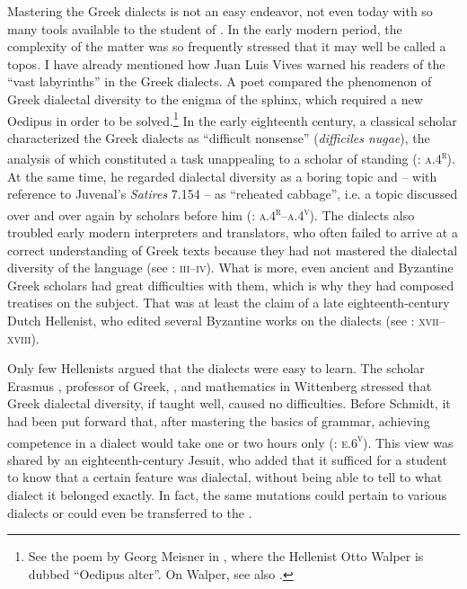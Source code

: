Mastering the Greek dialects is not an easy endeavor, not even today with so many tools available to the student of . In the early modern period, the complexity of the matter was so frequently stressed that it may well be called a topos. I have already mentioned how Juan Luis Vives warned his readers of the “vast labyrinths” in the Greek dialects. A  poet compared the phenomenon of Greek dialectal diversity to the enigma of the sphinx, which required a new Oedipus in order to be solved.\footnote{See the poem by Georg Meisner in \citet[††.2\textsc{\textsuperscript{r}}]{Walper1589}, where the Hellenist Otto Walper is dubbed “Oedipus alter”. On Walper, see also \citet[]{VanRooyFcc}.} In the early eighteenth century, a  classical scholar characterized the Greek dialects as “difficult nonsense” (\textit{difficiles nugae}), the analysis of which constituted a task unappealing to a scholar of standing (\citealt{Maittaire1706}: \textsc{a.4}\textsc{\textsuperscript{r}}). At the same time, he regarded dialectal diversity as a boring topic and – with reference to Juvenal’s \textit{Satires} 7.154 – as “reheated cabbage”, i.e. a topic discussed over and over again by scholars before him (\citealt{Maittaire1706}: \textsc{a.4}\textsc{\textsuperscript{r}}--\textsc{a.4}\textsc{\textsuperscript{v}}). The dialects also troubled early modern interpreters and translators, who often failed to arrive at a correct understanding of Greek texts because they had not mastered the dialectal diversity of the language (see \citealt{Facius1782}: \textsc{iii–iv}). What is more, even ancient and Byzantine Greek scholars had great difficulties with them, which is why they had composed treatises on the subject. That was at least the claim of a late eighteenth-century Dutch Hellenist, who edited several Byzantine works on the dialects (see \citealt{Koen1766}: \textsc{xvii–xviii}).

Only few Hellenists argued that the dialects were easy to learn. The  scholar Erasmus \citet[):(.2\textsc{\textsuperscript{r}}]{Schmidt1604}, professor of Greek, , and mathematics in Wittenberg stressed that Greek dialectal diversity, if taught well, caused no difficulties. Before Schmidt, it had been put forward that, after mastering the basics of grammar, achieving competence in a dialect would take one or two hours only (\citealt{Caselius1560}: \textsc{e.6}\textsc{\textsuperscript{v}}). This view was shared by an eighteenth-century  Jesuit, who added that it sufficed for a student to know that a certain feature was dialectal, without being able to tell to what dialect it belonged exactly. In fact, the same mutations could pertain to various dialects or could even be transferred to the  \citep[101]{Giraudeau1739}.

